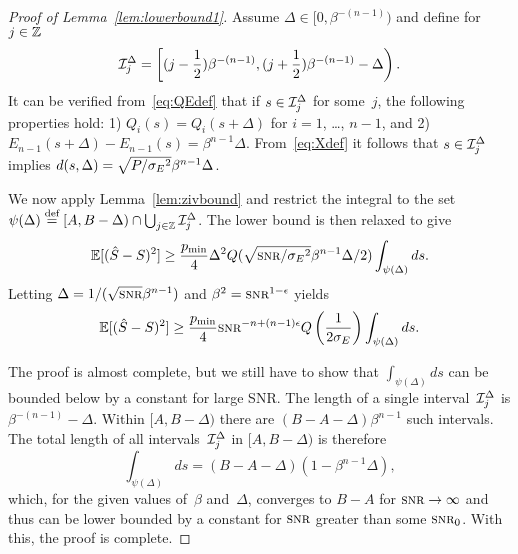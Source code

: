 \begin{proof}[Proof of Lemma~\ref{lem:lowerbound1}]
  Assume $\Delta \in [0, \beta^{-(n-1)})$ and define for $j \in \mathbb{Z}$
  \[ \mathcal{I}_j^\Delta = \left[ (j - \frac12 )\beta^{-(n-1)}, 
    (j + \frac12 ) \beta^{-(n-1)} - \Delta \right).\]
  It can be verified from~\eqref{eq:QEdef} that if $s \in \mathcal{I}_j^\Delta$ for
  some~$j$, the following properties hold: 1) $Q_i(s) = Q_i(s+\Delta)$ for
  $i=1$, \dots, $n-1$, and 2) $E_{n-1}(s+\Delta) - E_{n-1}(s) =
  \beta^{n-1}\Delta$.  From~\eqref{eq:Xdef} it follows that
  $s \in \mathcal{I}_j^\Delta$ implies $d(s, \Delta) = \sqrt{P/{{\sigma_E}^2}} \beta^{n-1}\Delta$.

  We now apply Lemma~\ref{lem:zivbound} and restrict the integral to the
  set~$\psi(\Delta) \stackrel{\text{def}}{=} [A,B-\Delta) \cap \bigcup_{j\in\mathbb{Z}} \mathcal{I}_j^\Delta$. The
  lower bound is then relaxed to give
  \begin{equation*}
    \mse \ge \frac{\pmin}{4} \Delta^2 Q(\sqrt{\snr/\seq} \beta^{n-1} \Delta/2)
    \int_{\psi(\Delta)} ds.
  \end{equation*}
  Letting $\Delta = 1/(\sqrt{\snr}\beta^{n-1})$ and $\beta^2 = \snr^{1-\e}$
  yields
  \begin{equation*}
    \mse \ge \frac{\pmin}{4} \snr^{-n+(n-1)\e} Q\left(\frac{1}{2\se}\right)
    \int_{\psi(\Delta)} ds.
  \end{equation*}

  The proof is almost complete, but we still have to show that
  $\int_{\psi(\Delta)}ds$ can be bounded below by a constant for large SNR. The
  length of a single interval~$\mathcal{I}_j^\Delta$ is $\beta^{-(n-1)} - \Delta$. Within
  $[A,B-\Delta)$ there are $(B-A-\Delta)\beta^{n-1}$ such
  intervals. The total length of all intervals~$\mathcal{I}_j^\Delta$ in $[A, B-\Delta)$
  is therefore
  \[ \int_{\psi(\Delta)} ds = (B-A-\Delta)
  (1 - \beta^{n-1}\Delta), \]
  which, for the given values of~$\beta$ and~$\Delta$, 
  converges to $B-A$ for $\snr \ra \infty$ and thus can be lower bounded by a
  constant for $\snr$ greater than some $\snr_0$. With this, the proof is
  complete.
\end{proof}


